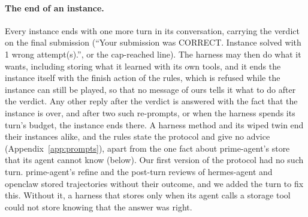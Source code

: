 \paragraph{The end of an instance.} Every instance ends with one more turn in its conversation, carrying the verdict on the final submission (``Your submission was CORRECT. Instance solved with 1 wrong attempt(s).'', or the cap-reached line). The harness may then do what it wants, including storing what it learned with its own tools, and it ends the instance itself with the finish action of the rules, which is refused while the instance can still be played, so that no message of ours tells it what to do after the verdict. Any other reply after the verdict is answered with the fact that the instance is over, and after two such re-prompts, or when the harness spends its turn's budget, the instance ends there. A harness method and its wiped twin end their instances alike, and the rules state the protocol and give no advice (Appendix~\ref{app:prompts}), apart from the one fact about prime-agent's store that its agent cannot know (below). Our first version of the protocol had no such turn. prime-agent's refine and the post-turn reviews of hermes-agent and openclaw stored trajectories without their outcome, and we added the turn to fix this. Without it, a harness that stores only when its agent calls a storage tool could not store knowing that the answer was right.

